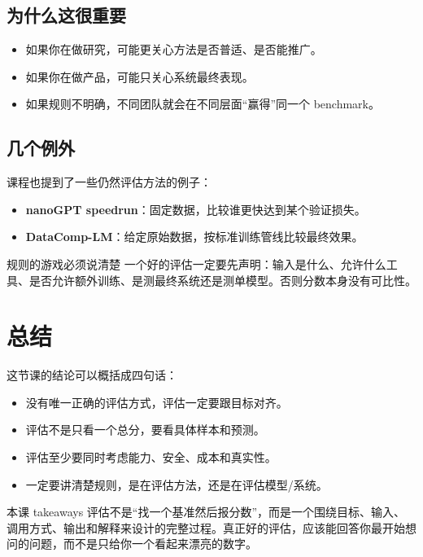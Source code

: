 \documentclass[a4paper]{article}
\begin{document}
\subsection{为什么这很重要}

\begin{itemize}
    \item 如果你在做研究，可能更关心方法是否普适、是否能推广。
    \item 如果你在做产品，可能只关心系统最终表现。
    \item 如果规则不明确，不同团队就会在不同层面“赢得”同一个 benchmark。
\end{itemize}

\subsection{几个例外}

课程也提到了一些仍然评估方法的例子：

\begin{itemize}
    \item \textbf{nanoGPT speedrun}：固定数据，比较谁更快达到某个验证损失。
    \item \textbf{DataComp-LM}：给定原始数据，按标准训练管线比较最终效果。
\end{itemize}

\begin{importantbox}{规则的游戏必须说清楚}
一个好的评估一定要先声明：输入是什么、允许什么工具、是否允许额外训练、是测最终系统还是测单模型。否则分数本身没有可比性。
\end{importantbox}

\section{总结}

这节课的结论可以概括成四句话：

\begin{itemize}
    \item 没有唯一正确的评估方式，评估一定要跟目标对齐。
    \item 评估不是只看一个总分，要看具体样本和预测。
    \item 评估至少要同时考虑能力、安全、成本和真实性。
    \item 一定要讲清楚规则，是在评估方法，还是在评估模型/系统。
\end{itemize}

\begin{knowledgebox}{本课 takeaways}
评估不是“找一个基准然后报分数”，而是一个围绕目标、输入、调用方式、输出和解释来设计的完整过程。真正好的评估，应该能回答你最开始想问的问题，而不是只给你一个看起来漂亮的数字。
\end{knowledgebox}
\end{document}
